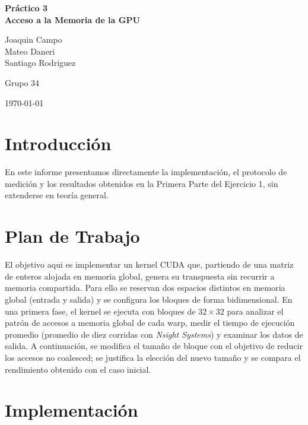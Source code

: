 \documentclass[a4paper,11pt]{article}
\begin{document}
\begin{titlepage}
  \thispagestyle{empty}     %
  \centering
  \vspace*{2cm}

  {\Huge\bfseries Práctico 3\\[0.5em]
   Acceso a la Memoria de la GPU\par}
  \vspace{1.5cm}
  \vfill                %

  {\Large
   Joaquin Campo\\
   Mateo Daneri\\
   Santiago Rodriguez\par}
  \vspace{1em}
  {\Large Grupo 34\par}

  \vspace{2cm}
  {\large \today\par}
\end{titlepage}

\section{Introducción}
En este informe presentamos directamente la implementación, el protocolo de medición y los resultados obtenidos en la Primera Parte del Ejercicio 1, sin extenderse en teoría general.

\section{Plan de Trabajo}
El objetivo aqui es implementar un kernel CUDA que, partiendo de una matriz de enteros alojada en memoria global, genera su transpuesta sin recurrir a memoria compartida. Para ello se reservan dos espacios distintos en memoria global (entrada y salida) y se configura los bloques de forma bidimensional. En una primera fase, el kernel se ejecuta con bloques de $32\times 32$ para analizar el patrón de accesos a memoria global de cada warp, medir el tiempo de ejecución promedio (promedio de diez corridas con \textit{Nsight Systems}) y examinar los datos de salida. A continuación, se modifica el tamaño de bloque con el objetivo de reducir los accesos no coalesced; se justifica la elección del nuevo tamaño y se compara el rendimiento obtenido con el caso inicial.

\section{Implementación}
\end{document}
